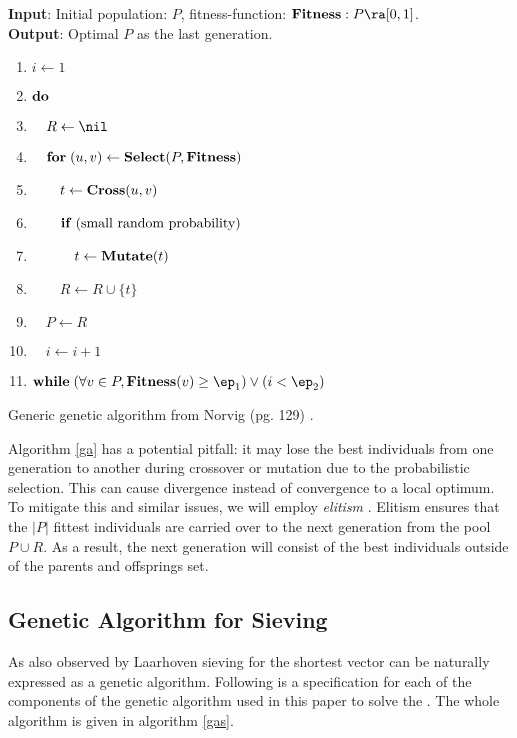 \documentclass{homework}
\begin{document}
\begin{algorithm}
  \begin{flushleft}
    \noindent\textbf{Input}:
      Initial population: $P$, fitness-function: $\FIT: P \ra [0, 1]$. \\
    \noindent\textbf{Output}:
      Optimal $P$ as the last generation.
  \end{flushleft}
  \begin{enumerate}[label=\arabic*:]
    \item $i \leftarrow 1$
    \item $\mathbf{do\;}$
    \item $\quad R \leftarrow \nil$
    \item $\quad \mathbf{for\;} (u, v) \leftarrow \mathbf{Select}(P, \mathbf{Fitness})$
    \item $\quad\quad t \leftarrow \mathbf{Cross}(u, v)$
    \item $\quad\quad \mathbf{if\;} (\text{small random probability})$
    \item $\quad\quad\quad t \leftarrow \mathbf{Mutate}(t)$
    \item $\quad\quad R \leftarrow R \cup \{t\}$
    \item $\quad P \leftarrow R$
    \item $\quad i \leftarrow i + 1$
    \item $\WHILE (\forall v \in P, \FIT(v) \geq \ep_1) \vee (i < \ep_2)$
  \end{enumerate}
  \caption{Generic genetic algorithm from Norvig (pg. 129)
    \cite{russell2016artificial}.}
  \label{ga}
\end{algorithm}

Algorithm \ref{ga} has a potential pitfall: it may lose the best
individuals from one generation to another during crossover or
mutation due to the probabilistic selection. This can cause divergence
instead of convergence to a local optimum. To mitigate this and
similar issues, we will employ \textit{elitism}
\cite{de1975analysis}. Elitism ensures that the $|P|$ fittest
individuals are carried over to the next generation from the pool
$P \cup R$. As a result, the next generation will consist of the best
individuals outside of the parents and offsprings set.


\subsection{Genetic Algorithm for Sieving} As also observed by
Laarhoven \cite{DBLP:journals/corr/abs-1907-04629} sieving for the
shortest vector can be naturally expressed as a genetic
algorithm. Following is a specification for each of the components of
the genetic algorithm used in this paper to solve the \appr\SVP. The
whole algorithm is given in algorithm \ref{gas}.
\end{document}
